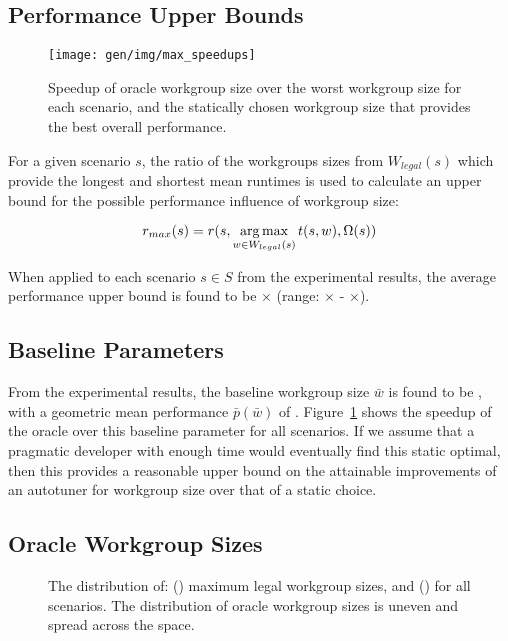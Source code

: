 \subsection{Performance Upper Bounds}

\begin{figure}
\texttt{[image: gen/img/max\_speedups]}
\caption{%
  Speedup of oracle workgroup size over the worst workgroup size for
  each scenario, and the statically chosen workgroup size that
  provides the best overall performance.%
}
\label{fig:speedups}
\end{figure}

For a given scenario $s$, the ratio of the workgroups sizes from
$W_{legal}(s)$ which provide the longest and shortest mean runtimes is
used to calculate an upper bound for the possible performance
influence of workgroup size:

\begin{equation}
r_{max}(s) = r(s, \operatorname*{arg\,max}_{w \in W_{legal}(s)} t(s,w), \Omega(s))
\end{equation}

When applied to each scenario $s \in S$ from the experimental results,
the average performance upper bound is found to be
$\times$ (range:
$\times$ -
$\times$).



\subsection{Baseline Parameters}

From the experimental results, the baseline workgroup size $\bar{w}$
is found to be , with a geometric mean performance
$\bar{p}(\bar{w})$ of
. Figure~\ref{fig:speedups} shows the speedup of
the oracle over this baseline parameter for all scenarios. If we
assume that a pragmatic developer with enough time would eventually
find this static optimal, then this provides a reasonable upper bound
on the attainable improvements of an autotuner for workgroup size over
that of a static choice.


\subsection{Oracle Workgroup Sizes}

\begin{figure}

\caption{%
  The distribution of: () maximum legal
  workgroup sizes, and () for all
  scenarios. The distribution of oracle workgroup sizes is uneven and
  spread across the space. %
}
\label{fig:heatmaps}
\end{figure}

